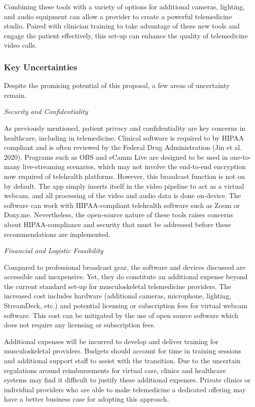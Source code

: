 \documentclass[
  letterpaper,
  DIV=11,
  numbers=noendperiod,
  oneside]{scrartcl}
\begin{document}
Combining these tools with a variety of options for additional cameras,
lighting, and audio equipment can allow a provider to create a powerful
telemedicine studio. Paired with clinician training to take advantage of
these new tools and engage the patient effectively, this set-up can
enhance the quality of telemedicine video calls.

\subsubsection{Key Uncertainties}\label{key-uncertainties}

Despite the promising potential of this proposal, a few areas of
uncertainty remain.

\emph{Security and Confidentiality}

As previously mentioned, patient privacy and confidentiality are key
concerns in healthcare, including in telemedicine. Clinical software is
required to by HIPAA compliant and is often reviewed by the Federal Drug
Administration (Jin et al. 2020). Programs such as OBS and eCamm Live
are designed to be used in one-to-many live-streaming scenarios, which
may not involve the end-to-end encryption now required of telehealth
platforms. However, this broadcast function is not on by default. The
app simply inserts itself in the video pipeline to act as a virtual
webcam, and all processing of the video and audio data is done
on-device. The software can work with HIPAA-compliant telehealth
software such as Zoom or Doxy.me. Nevertheless, the open-source nature
of these tools raises concerns about HIPAA-compliance and security that
must be addressed before these recommendations are implemented.

\emph{Financial and Logistic Feasibility}

Compared to professional broadcast gear, the software and devices
discussed are accessible and inexpensive. Yet, they do constitute an
additional expense beyond the current standard set-up for
musculoskeletal telemedicine providers. The increased cost includes
hardware (additional cameras, microphone, lighting, StreamDeck, etc.)
and potential licensing or subscription fees for virtual webcam
software. This cost can be mitigated by the use of open source software
which does not require any licensing or subscription fees.

Additional expenses will be incurred to develop and deliver training for
musculoskeletal providers. Budgets should account for time in training
sessions and additional support staff to assist with the transition. Due
to the uncertain regulations around reimbursements for virtual care,
clinics and healthcare systems may find it difficult to justify these
additional expenses. Private clinics or individual providers who are
able to make telemedicine a dedicated offering may have a better
business case for adopting this approach.
\end{document}
